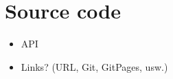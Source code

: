 \section{Source code}

\begin{itemize}
	\item API
	\item Links? (URL, Git, GitPages, usw.)
\end{itemize}
